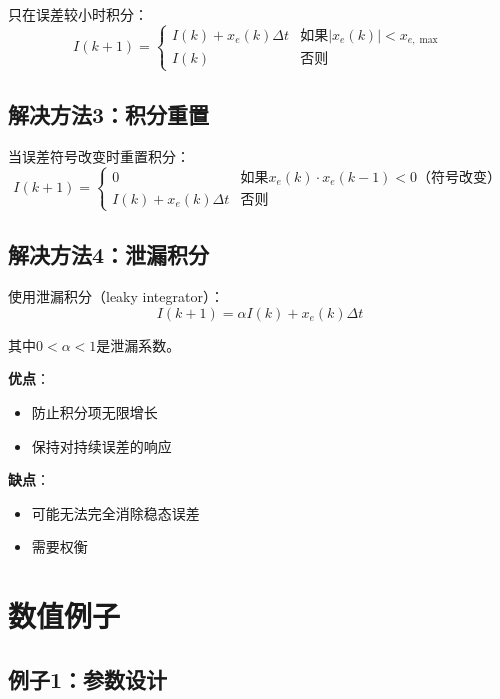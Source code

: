\documentclass[12pt,a4paper]{article}
\begin{document}
只在误差较小时积分：
\begin{equation}
I(k+1) = \begin{cases}
I(k) + x_e(k) \Delta t & \text{如果} |x_e(k)| < x_{e,\max} \\
I(k) & \text{否则}
\end{cases}
\end{equation}

\subsection{解决方法3：积分重置}

当误差符号改变时重置积分：
\begin{equation}
I(k+1) = \begin{cases}
0 & \text{如果} x_e(k) \cdot x_e(k-1) < 0 \text{（符号改变）} \\
I(k) + x_e(k) \Delta t & \text{否则}
\end{cases}
\end{equation}

\subsection{解决方法4：泄漏积分}

使用泄漏积分（leaky integrator）：
\begin{equation}
I(k+1) = \alpha I(k) + x_e(k) \Delta t
\end{equation}

其中$0 < \alpha < 1$是泄漏系数。

\textbf{优点}：
\begin{itemize}
\item 防止积分项无限增长
\item 保持对持续误差的响应
\end{itemize}

\textbf{缺点}：
\begin{itemize}
\item 可能无法完全消除稳态误差
\item 需要权衡
\end{itemize}

\section{数值例子}

\subsection{例子1：参数设计}
\end{document}
